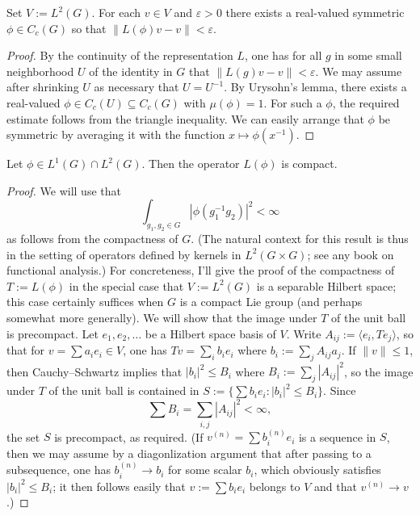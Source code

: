 \documentclass[reqno]{amsart} 
\def\eps{\varepsilon}
\begin{document}
\begin{lemma}\label{lem:approximate-vectors-by-convolutions}
  Set $V := L^2(G)$.
  For each $v \in V$ and $\eps > 0$
  there exists a real-valued symmetric $\phi \in C_c(G)$ so that
  $\|L(\phi) v - v \| < \eps$.
\end{lemma}
\begin{proof}
  By the continuity of the representation $L$,
  one has for all $g$ in some small neighborhood
  $U$ of the identity
  in $G$ that $\|L(g) v - v \| < \eps$.
  We may assume after shrinking $U$ as necessary that $U = U^{-1}$.
  By Urysohn's lemma,
  there exists a real-valued $\phi \in C_c(U) \subseteq C_c(G)$
  with $\mu(\phi) = 1$.
  For such a $\phi$, the required estimate follows
  from the triangle inequality.
  We can easily arrange that $\phi$ be symmetric
  by averaging it with the function $x \mapsto \phi(x^{-1})$.
\end{proof}

\begin{lemma}
  Let $\phi \in L^1(G) \cap L^2(G)$.
  Then the operator $L(\phi)$ is compact.
\end{lemma}
\begin{proof}
  We will use that
  \begin{equation}\label{eq:kernel-is-integrable}
    \int_{g_1,g_2 \in G}
    |\phi(g_1^{-1} g_2)|^2 < \infty
  \end{equation}
  as follows from the compactness of $G$.
  (The natural context for this result is thus
  in the setting of operators defined by kernels
  in $L^2(G \times G)$; see any book on functional analysis.)
  For concreteness, I'll give the proof
  of the compactness of $T := L(\phi)$ in the special case that
  $V := L^2(G)$
  is a separable Hilbert space; this case certainly suffices
  when $G$ is a compact Lie group (and perhaps somewhat more
  generally).
  We will show that the image under $T$ of the unit ball
  is precompact.
  Let $e_1,e_2,\dotsc$ be a Hilbert space basis of $V$.
  Write $A_{i j} := \langle e_i, T e_j \rangle$,
  so that for $v = \sum a_i e_i \in V$,
  one has $T v =
  \sum_{i} b_i e_i$
  where $b_i := \sum_j A_{i j} a_j$.
  If $\|v\| \leq 1$,
  then Cauchy--Schwartz
  implies that $|b_i|^2 \leq B_i$ where $B_i := \sum_{j} |A_{i
    j}|^2$,
  so
  the image under $T$ of the unit ball
  is contained in $S := \{\sum b_i e_i : |b_i|^2 \leq B_i\}$.
  Since
  \begin{equation}\label{eq:}
    \sum B_i =  \sum_{i,j} |A_{i j}|^2 < \infty,
  \end{equation}
  the set $S$ is precompact, as required.
  (If $v^{(n)} = \sum b_i^{(n)} e_i$ is a sequence in $S$,
  then we may assume by a diagonlization argument
  that after passing to a subsequence,
  one has $b_i^{(n)} \rightarrow b_i$ for some scalar $b_i$,
  which obviously satisfies $|b_i|^2 \leq B_i$;
  it then follows easily
  that $v := \sum b_i e_i$ belongs to $V$
  and that $v^{(n)} \rightarrow v$.)
\end{proof}
\end{document}
